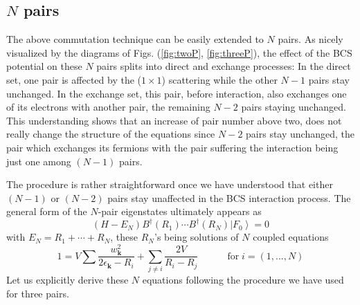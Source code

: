\documentclass[epj]{svjour}
\begin{document}
\subsection{$N$ pairs}

The above commutation technique can be easily extended to $N$ pairs. As nicely
visualized by the diagrams of Figs. (\ref{fig:twoP}, \ref{fig:threeP}), the
effect of the BCS potential on these $N$ pairs splits into direct and exchange processes:
In the direct set, one pair is affected by the ($1\times1$) scattering while the other $N-1
$ pairs stay unchanged. In the exchange set, this pair, before interaction, also 
exchanges one of its electrons with another pair, the remaining $N-2$
pairs staying unchanged. This understanding shows that an increase of pair number above two, does not really change the structure of the equations
since $N-2$ pairs stay unchanged, the pair which exchanges its fermions with the
pair suffering the interaction being just one among $(N-1)$ pairs.

The procedure is rather straightforward once we have understood
that either $(N-1)$ or $(N-2)$ pairs stay unaffected in the BCS interaction process. The
general form of the $N$-pair eigenstates ultimately appears as 
\begin{equation}  \label{eq:SchThreeN}
(H-E _N)B^{\dagger}(R_1)\cdots{}B^{\dagger}(R_N)\left|F_0\right>  =0
\end{equation}
with $E _N=R_1+\cdots+R_N$, these $R_N$'s being solutions of $N$ coupled
equations 
\begin{equation}
1=V\sum\frac{w_{\mathbf{k} }^2}{2\epsilon_{\mathbf{k} }-R_i}+\sum_{j\neq{i}}%
\frac{2V}{R_i-R_j}\quad\qquad \text{for}\; i=\left(1,...,N\right) 
\end{equation}
Let us explicitly derive these $N$ equations following the procedure we have used for three pairs. 
\end{document}
